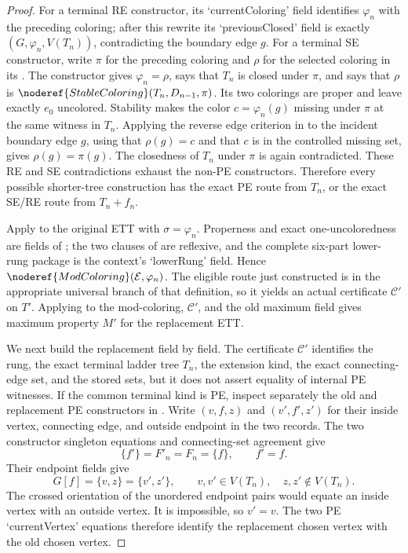 \begin{proof}
For a terminal RE constructor, its `currentColoring' field identifies
\(\varphi_n\) with the preceding coloring; after this rewrite its
`previousClosed' field is exactly
\((G,\varphi_n,V(T_n))\), contradicting
the boundary edge \(g\).  For a terminal SE constructor, write \(\pi\)
for the preceding coloring and \(\rho\) for the selected coloring in its
.  The constructor gives
\(\varphi_n=\rho\), says that \(T_n\) is closed under \(\pi\), and says
that \(\rho\) is \(\noderef{StableColoring}(T_n,D_{n-1},\pi)\).  Its two
colorings are proper and leave exactly \(e_0\) uncolored.  Stability makes
the color \(c=\varphi_n(g)\) missing under \(\pi\) at the same witness in
\(T_n\).  Applying the reverse edge criterion in  to the
incident boundary edge \(g\), using that \(\rho(g)=c\) and that \(c\) is
in the controlled missing set, gives \(\rho(g)=\pi(g)\).  The closedness
of \(T_n\) under \(\pi\) is again contradicted.  These RE and SE
contradictions exhaust the non-PE constructors.  Therefore every possible
shorter-tree construction has the exact PE route from \(T_n\), or the
exact SE/RE route from \(T_n+f_n\).

Apply  to the original ETT with \(\sigma=\varphi_n\).
Properness and exact one-uncoloredness are fields of
; the two clauses of
 are reflexive, and the complete six-part
lower-rung package is the context's `lowerRung' field.  Hence
\(\noderef{ModColoring}(\mathcal E,\varphi_n)\).  The eligible route just
constructed is in the appropriate universal branch of that definition,
so it yields an actual
 certificate \(\mathcal C'\)
on \(T'\).  Applying  to the mod-coloring,
\(\mathcal C'\), and the old maximum field gives maximum property \(M'\)
for the replacement ETT.

We next build the replacement  field by field.
The certificate \(\mathcal C'\) identifies the rung, the exact terminal
ladder tree \(T_n\), the extension kind, the exact connecting-edge set,
and the stored sets, but it does not assert equality of internal PE
witnesses.  If the common terminal kind is PE, inspect separately the old
and replacement PE constructors in .  Write
\((v,f,z)\) and \((v',f',z')\) for their inside vertex, connecting edge,
and outside endpoint in the two  records.
The two constructor singleton equations and connecting-set agreement give
\[
                  \{f'\}=F'_n=F_n=\{f\},\qquad f'=f.          \tag{P1}
\]
Their endpoint fields give
\[
 G[f]=\{v,z\}=\{v',z'\},\qquad
 v,v'\in V(T_n),\quad z,z'\notin V(T_n).                     \tag{P2}
\]
The crossed orientation of the unordered endpoint pairs would equate an
inside vertex with an outside vertex.  It is impossible, so \(v'=v\).
The two PE `currentVertex' equations therefore identify the replacement
chosen vertex with the old chosen vertex.


\end{proof}
